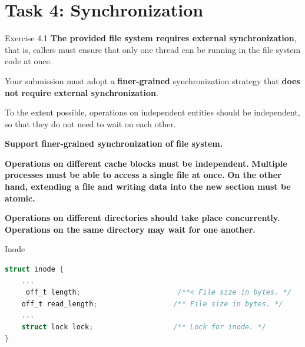 \documentclass[10pt]{beamer}
\begin{document}
\section{Task 4: Synchronization}
\begin{frame}[fragile]{Exercise 4.1}
    \textbf{The provided file system requires external synchronization}, that is, callers must ensure that only one thread can be running in the file system code at once.

Your submission must adopt a \textbf{finer-grained} synchronization strategy that \textbf{does not require external synchronization}.

To the extent possible, operations on independent entities should be independent, so that they do not need to wait on each other.

\textbf{Support finer-grained synchronization of file system.}

\textbf{Operations on different cache blocks must be independent.}
\textbf{Multiple processes must be able to access a single file at once.}
\textbf{On the other hand, extending a file and writing data into the new section must be atomic.}

\textbf{Operations on different directories should take place concurrently. Operations on the same directory may wait for one another.}
\end{frame}
\begin{frame}[fragile]{Inode}
\begin{lstlisting}[language=C]
struct inode { 
    ...
     off_t length;                       /**< File size in bytes. */
    off_t read_length;                  /** File size in bytes. */
    ...
    struct lock lock;                   /** Lock for inode. */
}
\end{lstlisting}
\end{frame}
\end{document}
